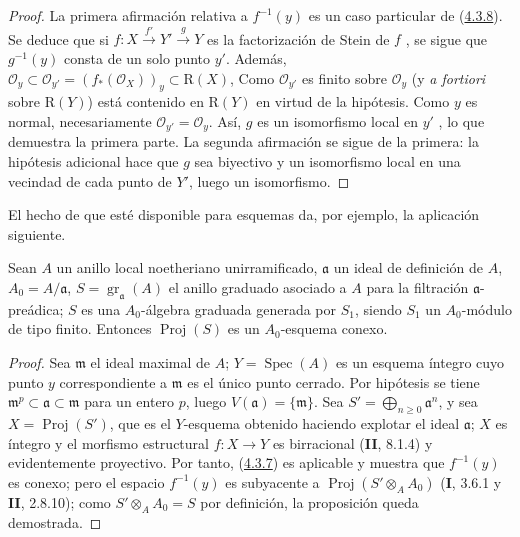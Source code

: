 \begin{proof}
La primera afirmación relativa a $f^{-1}(y)$ es un caso particular de (\hyperref[III.4.3.8-fr]{4.3.8}). Se
deduce que si $f:X\xrightarrow{f'}Y'\xrightarrow{g}Y$
es la factorización de Stein de $f$ , se sigue que
$g^{-1}(y)$ consta de un solo punto $y'$. Además,
$\mathcal O_y\subset\mathcal O_{y'}=(f_*(\mathcal O_X))_y
\subset\mathrm R(X)$,
Como $\mathcal O_{y'}$ es finito sobre $\mathcal O_y$ (y \emph{a fortiori} sobre $\mathrm R(Y)$) está contenido en $\mathrm R(Y)$ en virtud de la hipótesis. Como $y$ es normal, necesariamente
$\mathcal O_{y'}=\mathcal O_y$. Así, $g$ es un isomorfismo local en $y'$
, lo que demuestra la primera parte. La segunda
afirmación se sigue de la primera: la hipótesis adicional hace que $g$
sea biyectivo y un isomorfismo local en una vecindad de cada punto de
$Y'$, luego un isomorfismo.
\end{proof}

El hecho de que  esté disponible para esquemas da, por
ejemplo, la aplicación siguiente.

\begin{proposition}[4.3.13]
\label{III.4.3.13-fr}
Sean $A$ un anillo local noetheriano unirramificado, $\mathfrak a$ un ideal de
definición de $A$, $A_0=A/\mathfrak a$,
$S=\operatorname{gr}_{\mathfrak a}(A)$ el anillo graduado asociado a $A$ para
la filtración $\mathfrak a$-preádica; $S$ es una $A_0$-álgebra graduada
generada por $S_1$, siendo $S_1$ un $A_0$-módulo de tipo finito. Entonces
$\operatorname{Proj}(S)$ es un $A_0$-esquema conexo.
\end{proposition}

\begin{proof}
Sea $\mathfrak m$ el ideal maximal de $A$; $Y=\operatorname{Spec}(A)$ es
un esquema íntegro cuyo punto $y$ correspondiente a $\mathfrak m$ es
el único punto cerrado. Por hipótesis se tiene
$\mathfrak m^p\subset\mathfrak a\subset\mathfrak m$ para un entero $p$,
luego $V(\mathfrak a)=\{\mathfrak m\}$. Sea
$S'=\bigoplus_{n\geq0}\mathfrak a^n$, y sea
$X=\operatorname{Proj}(S')$, que es el $Y$-esquema obtenido haciendo explotar
el ideal $\mathfrak a$; $X$ es íntegro y el morfismo estructural
$f:X\to Y$ es birracional (\textbf{II}, 8.1.4) y evidentemente proyectivo. Por tanto,
(\hyperref[III.4.3.7-fr]{4.3.7}) es aplicable y muestra que $f^{-1}(y)$
es conexo; pero el espacio $f^{-1}(y)$ es subyacente a
$\operatorname{Proj}(S'\otimes_AA_0)$ (\textbf{I}, 3.6.1 y \textbf{II}, 2.8.10); como
$S'\otimes_AA_0=S$ por definición, la proposición queda demostrada.
\end{proof}

